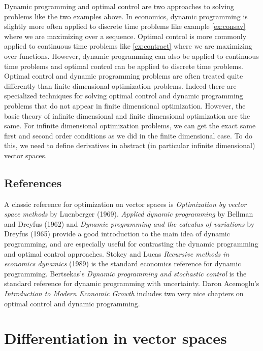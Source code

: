 \documentclass[12pt,reqno]{amsart}
\theoremstyle{definition}
\begin{document}
Dynamic programming and optimal control are two approaches to solving
problems like the two examples above. In economics, dynamic
programming is slightly more often applied to discrete time problems
like example \ref{ex:consav} where we are maximizing over a sequence. Optimal
control is more commonly applied to continuous time problems like
\ref{ex:contract} where we are maximizing over functions. However,
dynamic programming can also be applied to continuous time problems
and optimal control can be applied to discrete time problems. 
Optimal control and dynamic programming 
problems are often treated quite differently than finite dimensional
optimization problems. Indeed there are specialized techniques for
solving optimal control and dynamic programming problems that do not
appear in finite dimensional optimization. However, the basic theory
of infinite dimensional and finite dimensional optimization are the
same. 
For infinite dimensional optimization problems, we can get the exact
same first and second order conditions as we did in the finite
dimensional case. To do this, we need to define derivatives in
abstract (in particular infinite dimensional) vector spaces. 

\subsection{References}
A classic reference for optimization on vector spaces is
\textit{Optimization by vector space methods} by Luenberger
(1969). \textit{Applied dynamic programming} by Bellman and Dreyfus
(1962) and \textit{Dynamic programming and the calculus of variations}
by Dreyfus (1965) provide a good introduction to the main idea of
dynamic programming, and are especially useful for contrasting the
dynamic programming and optimal control approaches. Stokey and Lucas
\textit{Recursive methods in economics dynamics} (1989) is the
standard economics reference for dynamic programming. Bertsekas's
\textit{Dynamic programming and stochastic control} is the standard
reference for dynamic programming with uncertainty. Daron Acemoglu's
\textit{Introduction to Modern Economic Growth} includes two very nice
chapters on optimal control and dynamic programming.


\section{Differentiation in vector spaces}
\end{document}
